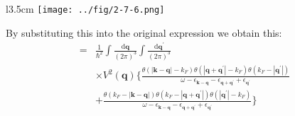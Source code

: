 \begin{wrapfigure}[4]{l}{3.5cm}
\label{Fig2.7.6} \texttt{[image: ../fig/2-7-6.png]}
\end{wrapfigure}

By substituting this into the original expression we obtain this:
\begin{equation} \label{Eqs2.7.1} \begin{split}
= & \frac{1}{\hbar^2} \int \frac{\mathrm{d}\mathbf{q}}{\left( 2\pi \right)^3} \int \frac{\mathrm{d}\mathbf{q}^{'}}{\left( 2\pi \right)^3} \\
& \times V^2(\mathbf{q}) \{
\frac{\theta(|\mathbf{k}-\mathbf{q}|-k_F)\theta(|\mathbf{q}+\mathbf{q}^{'}|-k_F)\theta(k_F-|\mathbf{q}^{'}|)}{\omega - \epsilon_{\mathbf{k}-\mathbf{q}}-\epsilon_{\mathbf{q}+\mathbf{q}^{'}}+\epsilon_{\mathbf{q}^{'}}}
\\
&+\frac{\theta(k_F-|\mathbf{k}-\mathbf{q}|)\theta(k_F-|\mathbf{q}+\mathbf{q}^{'}|)\theta(|\mathbf{q}^{'}|-k_F)}{\omega - \epsilon_{\mathbf{k}-\mathbf{q}}-\epsilon_{\mathbf{q}+\mathbf{q}^{'}}+\epsilon_{\mathbf{q}^{'}}}
\} \end{split}\end{equation}

